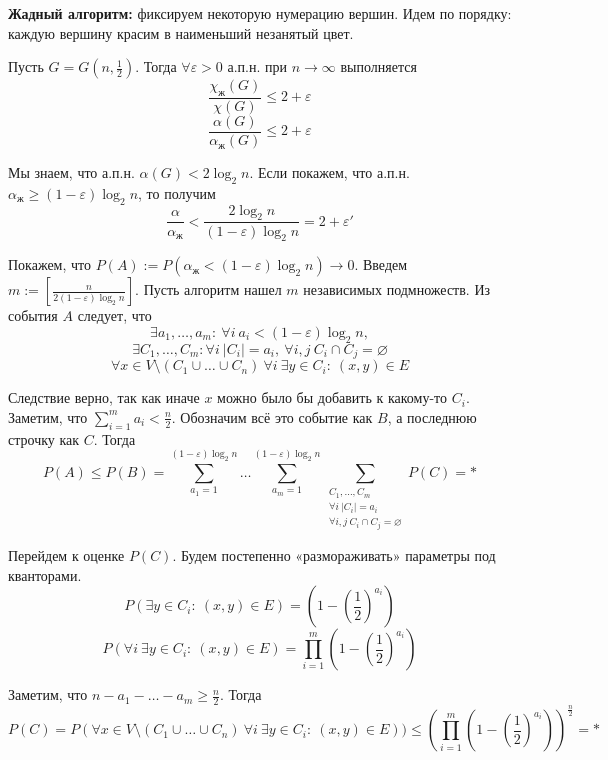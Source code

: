 \par \textbf{Жадный алгоритм:} фиксируем некоторую нумерацию вершин. Идем по порядку: каждую вершину красим в наименьший незанятый цвет.

\par \Th Пусть $G = G(n, \frac{1}{2})$. Тогда $\forall \varepsilon > 0$ а.п.н. при $n\rightarrow \infty$ выполняется
$$\frac{\chi_{\text{ж}}(G)}{\chi(G)} \leq 2+\varepsilon$$
$$\frac{\alpha(G)}{\alpha_{\text{ж}}(G)} \leq 2+\varepsilon$$
\par \Proof Мы знаем, что а.п.н. $\alpha(G) < 2\log_2 n$. Если покажем, что а.п.н. $\alpha_{\text{ж}} \geq (1-\varepsilon)\log_2 n$, то получим
$$\frac{\alpha}{\alpha_{\text{ж}}} < \frac{2\log_2 n}{(1-\varepsilon)\log_2 n}=2+\varepsilon'$$

\par Покажем, что $P(A):=P(\alpha_{\text{ж}} < (1-\varepsilon)\log_2 n)\rightarrow 0$. Введем $m:=[\frac{n}{2(1-\varepsilon)\log_2 n}]$. Пусть алгоритм нашел $m$ независимых подмножеств. Из события $A$ следует, что $$\exists a_1, \ldots, a_m: \: \forall i \: a_i < (1-\varepsilon)\log_2 n,$$ $$\exists C_1, \ldots, C_m: \forall i \: |C_i|=a_i, \: \forall i, j \: C_i \cap C_j = \varnothing$$ 
$$\forall x \in V \setminus (C_1 \cup \ldots \cup C_n) \: \forall i \: \exists y \in C_i: \: (x, y)\in E$$

\par Следствие верно, так как иначе $x$ можно было бы добавить к какому-то $C_i$. Заметим, что $\sum_{i=1}^m a_i < \frac{n}{2}$. Обозначим всё это событие как $B$, а последнюю строчку как $C$. Тогда
$$P(A) \leq P(B) = \sum_{a_1=1}^{(1-\varepsilon)\log_2 n} \ldots \sum_{a_m=1}^{(1-\varepsilon)\log_2 n} \sum_{\substack{C_1, \ldots, C_m \\ \forall i \: |C_i|=a_i \\ \forall i, j \: C_i \cap C_j = \varnothing}} P(C)=*$$

\par Перейдем к оценке $P(C)$. Будем постепенно «размораживать» параметры под кванторами.
$$P(\exists y \in C_i: \: (x, y)\in E)=\left(1-\left(\frac{1}{2}\right)^{a_i}\right)$$
$$P(\forall i \: \exists y \in C_i: \: (x, y)\in E)=\prod_{i=1}^m \left(1-\left(\frac{1}{2}\right)^{a_i}\right)$$

\par Заметим, что $n-a_1-\ldots-a_m \geq \frac{n}{2}$. Тогда
$$P(C)=P(\forall x \in V \setminus (C_1 \cup \ldots \cup C_n) \: \forall i \: \exists y \in C_i: \: (x, y)\in E))\leq\left(\prod_{i=1}^m \left(1-\left(\frac{1}{2}\right)^{a_i}\right)\right)^{\frac{n}{2}}=*$$

